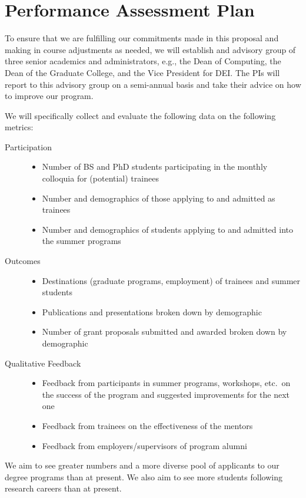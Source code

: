\documentclass[11pt]{NSFamsart}
\begin{document}
\section{Performance Assessment Plan  }
 
To ensure that we are fulfilling our commitments made in this proposal and making in course adjustments as needed, we will establish and advisory group of three senior academics and administrators, e.g., the Dean of Computing, the Dean of the Graduate College, and the Vice President for DEI.  The PIs will report to this advisory group on a semi-annual basis and take their advice on how to improve our program.

We will specifically collect and evaluate the following data on the following metrics:

\begin{description}
	\item[Participation] \phantom{a}
	\begin{itemize}
		\item Number of BS and PhD students participating in the monthly colloquia for (potential) trainees
		\item Number and demographics of those applying to and admitted as trainees
		\item Number and demographics of students applying to and admitted into the summer programs
	\end{itemize}
	\item[Outcomes] \phantom{a}
	\begin{itemize}
		\item Destinations (graduate programs, employment) of trainees and summer students
		\item Publications and presentations broken down by demographic
		\item Number of grant proposals submitted and awarded broken down by demographic
	\end{itemize}
	\item[Qualitative Feedback] \phantom{a}
\begin{itemize}
\item Feedback from participants in summer programs, workshops, etc.\ on the success of the program and suggested improvements for the next one
\item Feedback from trainees on the effectiveness of the mentors
\item Feedback from employers/supervisors of program alumni
\end{itemize}
\end{description}
We aim to see greater numbers and a more diverse pool of  applicants to our degree programs than at present.  We also aim to see more students following research careers than at present.  
 
\end{document}
